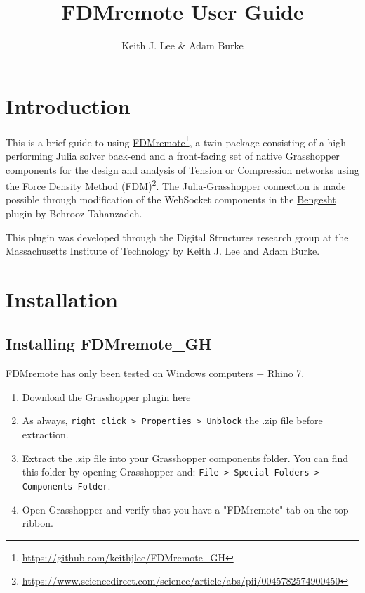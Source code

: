 \documentclass{ol-softwaremanual}
\title{FDMremote User Guide}
\author{Keith J. Lee \& Adam Burke}
\newcommand{\doclink}[2]{\href{#1}{#2}\footnote{\url{#1}}}
\begin{document}
\maketitle

\tableofcontents
\newpage

\section{Introduction}
This is a brief guide to using \doclink{https://github.com/keithjlee/FDMremote_GH}{FDMremote}, a twin package consisting of a high-performing Julia solver back-end and a front-facing set of native Grasshopper components for the design and analysis of Tension or Compression networks using the \doclink{https://www.sciencedirect.com/science/article/abs/pii/0045782574900450}{Force Density Method (FDM)}. The Julia-Grasshopper connection is made possible through modification of the WebSocket components in 
 the \href{https://www.food4rhino.com/en/app/bengesht}{Bengesht} plugin by Behrooz Tahanzadeh.

This plugin was developed through the Digital Structures research group at the Massachusetts Institute of Technology by Keith J. Lee and Adam Burke. 

\section{Installation} \label{sec:installation}

\subsection{Installing FDMremote\_GH}
\begin{center}
    {\color{kpink} FDMremote has only been tested on Windows computers + Rhino 7.}
\end{center}

\begin{enumerate}
    \item Download the Grasshopper plugin \href{https://www.food4rhino.com/en/app/fdmremote?lang=en}{here}
    \item As always, \texttt{right click > Properties > Unblock} the .zip file before extraction.
    \item Extract the .zip file into your Grasshopper components folder. You can find this folder by opening Grasshopper and: \texttt{File > Special Folders > Components Folder}.
    \item Open Grasshopper and verify that you have a "FDMremote" tab on the top ribbon.
\end{enumerate}
\end{document}
